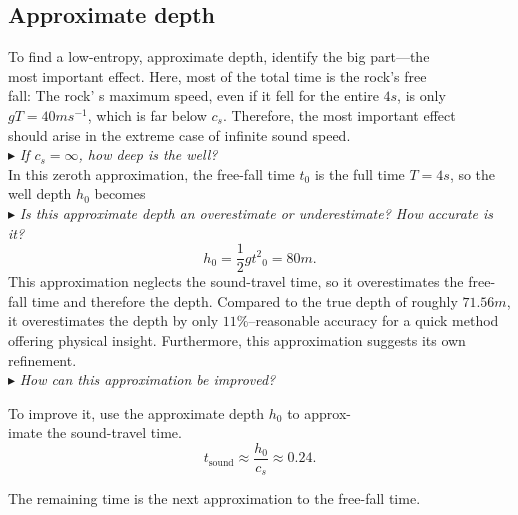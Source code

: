 \documentclass{book}
\begin{document}
\subsection{\Large Approximate depth}

\Large To find a low-entropy, approximate depth, identify the big part---the\\
most important effect. Here, most of the total time is the rock's free\\
fall: The rock' s maximum speed, even if it fell for the entire $4 s$, is only\\
$gT = 40ms^{-1}$, which is far below $c_s$. Therefore, the most important effect\\
should arise in the extreme case of infinite sound speed.\\[6pt]
 $\blacktriangleright$ \textit{If $c_s = \infty$, how deep is the well?}\\[6pt]
\Large In this zeroth approximation, the free-fall time $t_0$ is the full time $T = 4 s$,
so the well depth $h_0$ becomes\\[6pt]
 $\blacktriangleright$ \textit{Is this approximate depth an overestimate or underestimate? How accurate is it?}\\[6pt]
\begin{equation}
{h_0=\frac1{2}g{t^2}_0=80m}.
\end{equation}
\Large This approximation neglects the sound-travel time, so it overestimates
the free-fall time and therefore the depth. Compared to the true depth
of roughly $71.56 m$, it overestimates the depth by only $11\%$--reasonable
accuracy for a quick method offering physical insight. Furthermore, this
approximation suggests its own refinement.\\[6pt]
 $\blacktriangleright$ \textit{How can this approximation be improved?}\\[6pt]
\begin{minipage}{\textwidth}
\Large To improve it, use the approximate depth $h_0$ to approx-\\
imate the sound-travel time.\\
\begin{equation}
{t_{\textrm{sound}}\approx \frac{h_0}{c_s}\approx 0.24}.
\end{equation}
\end{minipage}
\Large The remaining time is the next approximation to the free-fall time.
\end{document}
